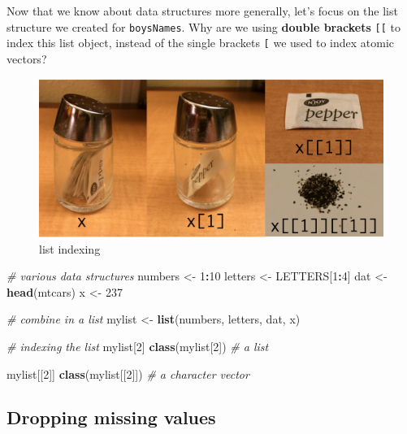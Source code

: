 \documentclass[]{book}
\newenvironment{Shaded}{\begin{snugshade}}{\end{snugshade}}
\newcommand{\CommentTok}[1]{\textcolor[rgb]{0.56,0.35,0.01}{\textit{#1}}}
\newcommand{\DecValTok}[1]{\textcolor[rgb]{0.00,0.00,0.81}{#1}}
\newcommand{\KeywordTok}[1]{\textcolor[rgb]{0.13,0.29,0.53}{\textbf{#1}}}
\newcommand{\NormalTok}[1]{#1}
\newcommand{\OperatorTok}[1]{\textcolor[rgb]{0.81,0.36,0.00}{\textbf{#1}}}
\newcommand{\StringTok}[1]{\textcolor[rgb]{0.31,0.60,0.02}{#1}}
\begin{document}
Now that we know about data structures more generally, let's focus on the list structure we created for \texttt{boysNames}.
Why are we using \textbf{double brackets} \texttt{{[}{[}} to index this list object, instead of the single brackets \texttt{{[}} we used to index atomic vectors?

\begin{figure}
\centering
\includegraphics{R/RDataWrangling/images/indexing_lists.png}
\caption{list indexing}
\end{figure}

\begin{Shaded}
\begin{Highlighting}[]
\CommentTok{# various data structures}
\NormalTok{numbers <-}\StringTok{ }\DecValTok{1}\OperatorTok{:}\DecValTok{10}
\NormalTok{letters <-}\StringTok{ }\NormalTok{LETTERS[}\DecValTok{1}\OperatorTok{:}\DecValTok{4}\NormalTok{]}
\NormalTok{dat <-}\StringTok{ }\KeywordTok{head}\NormalTok{(mtcars)}
\NormalTok{x <-}\StringTok{ }\DecValTok{237}

\CommentTok{# combine in a list}
\NormalTok{mylist <-}\StringTok{ }\KeywordTok{list}\NormalTok{(numbers, letters, dat, x)}

\CommentTok{# indexing the list}
\NormalTok{mylist[}\DecValTok{2}\NormalTok{]}
\KeywordTok{class}\NormalTok{(mylist[}\DecValTok{2}\NormalTok{]) }\CommentTok{# a list}

\NormalTok{mylist[[}\DecValTok{2}\NormalTok{]]}
\KeywordTok{class}\NormalTok{(mylist[[}\DecValTok{2}\NormalTok{]]) }\CommentTok{# a character vector}
\end{Highlighting}
\end{Shaded}

\hypertarget{dropping-missing-values}{%
\subsection{Dropping missing values}\label{dropping-missing-values}}
\end{document}
